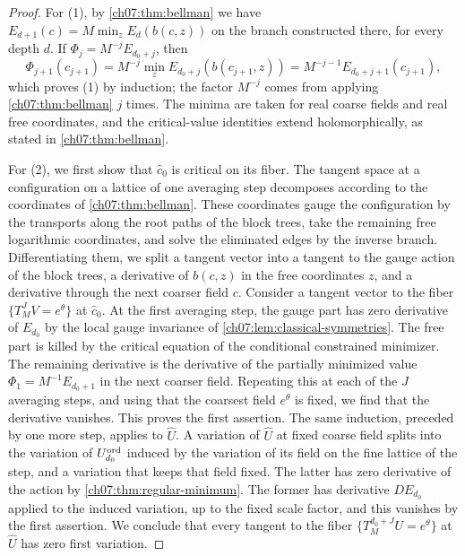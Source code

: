 \begin{proof}
For (1), by \cref{ch07:thm:bellman} we have $E_{d+1}(c)=M\min_zE_d(b(c,z))$ on the branch constructed there, for every depth $d$. If $\Phi_j=M^{-j}E_{d_0+j}$, then
\[
 \Phi_{j+1}(c_{j+1})=M^{-j}\min_zE_{d_0+j}(b(c_{j+1},z))=M^{-j-1}E_{d_0+j+1}(c_{j+1}),
\]
which proves (1) by induction; the factor $M^{-j}$ comes from applying \cref{ch07:thm:bellman} $j$ times. The minima are taken for real coarse fields and real free coordinates, and the critical-value identities extend holomorphically, as stated in \cref{ch07:thm:bellman}.

For (2), we first show that $\widehat c_0$ is critical on its fiber. The tangent space at a configuration on a lattice of one averaging step decomposes according to the coordinates of \cref{ch07:thm:bellman}. These coordinates gauge the configuration by the transports along the root paths of the block trees, take the remaining free logarithmic coordinates, and solve the eliminated edges by the inverse branch. Differentiating them, we split a tangent vector into a tangent to the gauge action of the block trees, a derivative of $b(c,z)$ in the free coordinates $z$, and a derivative through the next coarser field $c$. Consider a tangent vector to the fiber $\{T_M^JV=e^\theta\}$ at $\widehat c_0$. At the first averaging step, the gauge part has zero derivative of $E_{d_0}$ by the local gauge invariance of \cref{ch07:lem:classical-symmetries}. The free part is killed by the critical equation of the conditional constrained minimizer. The remaining derivative is the derivative of the partially minimized value $\Phi_1=M^{-1}E_{d_0+1}$ in the next coarser field. Repeating this at each of the $J$ averaging steps, and using that the coarsest field $e^\theta$ is fixed, we find that the derivative vanishes. This proves the first assertion. The same induction, preceded by one more step, applies to $\widehat U$. A variation of $\widehat U$ at fixed coarse field splits into the variation of $U^{\rm ord}_{d_0}$ induced by the variation of its field on the fine lattice of the step, and a variation that keeps that field fixed. The latter has zero derivative of the action by \cref{ch07:thm:regular-minimum}. The former has derivative $DE_{d_0}$ applied to the induced variation, up to the fixed scale factor, and this vanishes by the first assertion. We conclude that every tangent to the fiber $\{T_M^{d_0+J}U=e^\theta\}$ at $\widehat U$ has zero first variation.


\end{proof}
